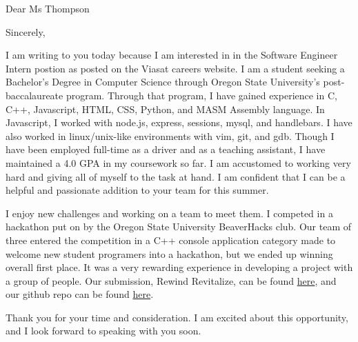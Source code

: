 \documentclass[11pt,a4paper,sans]{moderncv}        %
\begin{document}
\date{April 16, 2019}
\opening{Dear Ms Thompson}
\closing{Sincerely,}
\makelettertitle

I am writing to you today because I am interested in in the Software Engineer Intern postion as posted on the Viasat careers website. I am a student seeking a Bachelor's Degree in Computer Science through Oregon State University's post-baccalaureate program. Through that program, I have gained experience in C, C++, Javascript, HTML, CSS, Python, and MASM Assembly language. In Javascript, I worked with node.js, express, sessions, mysql, and handlebars. I have also  worked in linux/unix-like environments with vim, git, and gdb. Though I have been employed full-time as a driver and as a teaching assistant, I have maintained a 4.0 GPA in my coursework so far. I am accustomed to working very hard and giving all of myself to the task at hand. I am confident that I can be a helpful and passionate addition to your team for this summer.

I enjoy new challenges and working on a team to meet them. I competed in a hackathon put on by the Oregon State University BeaverHacks club. Our team of three entered the competition in a C++ console application category made to welcome new student programers into a hackathon, but we ended up winning overall first place. It was a very rewarding experience in developing a project with a group of people. Our submission, Rewind Revitalize, can be found \textcolor{red}{\href{https://devpost.com/software/rewind-revitalize}{here}}, and our github repo can be found \textcolor{red}{\href{https://github.com/jkbartos/rewind-revitalize}{here}}.

Thank you for your time and consideration. I am excited about this opportunity, and I look forward to speaking with you soon.



\makeletterclosing
\end{document}
